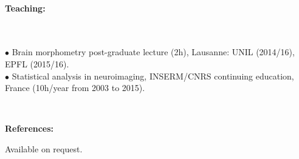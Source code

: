 \documentclass[english,10pt,a4paper]{scrartcl}
\begin{document}
\ \\
\noindent 
\begin{minipage}{.15\textwidth}
{\bf Teaching:}
\ \\ 
\ \\
\  \\
\end{minipage}
\begin{minipage}{.85\textwidth}
{\tiny$\bullet$} Brain morphometry post-graduate lecture (2h), Lausanne: UNIL (2014/16), EPFL (2015/16).\\
{\tiny$\bullet$} Statistical analysis in neuroimaging, INSERM/CNRS continuing education, France (10h/year from 2003 to 2015).\\
\end{minipage}


\ \\
\noindent 
\begin{minipage}{.15\textwidth}
{\bf References:}
\end{minipage}
\begin{minipage}{.85\textwidth}
Available on request.
\end{minipage}

%
\end{document}
